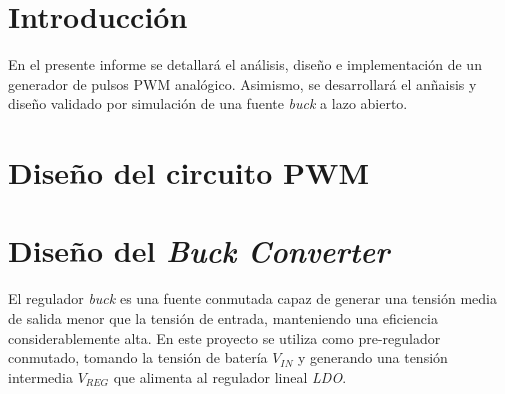 \documentclass[a4paper,12pt]{article}
\begin{document}
\vspace{2em}
\thispagestyle{empty}

\begin{abstract}
En este informe se presenta el análisis, diseño e implementación de un generador de pulsos PWM analógico y el diseño preliminar de una fuente conmutada \textit{buck} a lazo abierto. Para el generador PWM se estudió el funcionamiento de las etapas que determinan la señal triangular y la comparación con una referencia continua, obteniéndose experimentalmente una frecuencia de oscilación de aproximadamente $\SI{118}{\kilo\hertz}$. Para el convertidor \textit{buck}, se desarrolló el modelo ideal en régimen permanente y conducción continua, se determinó la relación entre ciclo de trabajo y tensión de salida, y se dimensionaron los componentes principales para obtener una tensión intermedia cercana a $\SI{9.5}{\volt}$ a partir de una entrada variable entre $\SI{12}{\volt}$ y $\SI{30}{\volt}$. Finalmente, se analizaron las solicitaciones sobre los dispositivos de potencia, los capacitores y el inductor, incluyendo un diseño preliminar del componente magnético mediante el método de Erickson.
\end{abstract}

\newpage


\tableofcontents

\newpage

\section{Introducción}

En el presente informe se detallará el análisis, diseño e implementación de un generador de pulsos PWM analógico. Asimismo, se desarrollará el anñaisis y diseño validado por simulación de una fuente \textit{buck} a lazo abierto.

\section{Diseño del circuito PWM}



\section{Diseño del \textit{Buck Converter}}

El regulador \textit{buck} es una fuente conmutada capaz de generar una tensión media de salida menor que la tensión de entrada, manteniendo una eficiencia considerablemente alta. En este proyecto se utiliza como pre-regulador conmutado, tomando la tensión de batería $V_{IN}$ y generando una tensión intermedia $V_{REG}$ que alimenta al regulador lineal \textit{LDO}.
\end{document}
